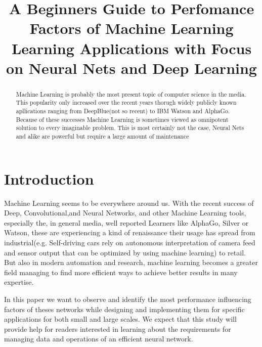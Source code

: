 \documentclass[conference]{IEEEtran}
\begin{document}
\title{
A Beginners Guide to Perfomance Factors of Machine Learning Learning Applications with Focus on Neural Nets and Deep Learning
}

\author{
}

\maketitle

\begin{abstract}

Machine Learning is probably the most present topic of computer science in the media. This popularity only increased over the recent years thorugh widely publicly known apllications ranging from DeepBlue(not so recent) to IBM Watson and AlphaGo. Because of these successes Machine Learning is sometimes viewed as omnipotent solution to every imaginable problem. This is most certainly not the case, Neural Nets and alike are powerful but require a large amount of maintenance

\end{abstract}

\IEEEpeerreviewmaketitle
\section{Introduction}
Machine Learning seems to be everywhere around us. With the recent success of Deep, Convolutional,and Neural Networks, and other Machine Learning tools, especially the, in general media, well reported Learners like AlphaGo, Silver or Watson, these are experiencing a kind of renaissance their usage has spread from industrial(e.g. Self-driving cars rely on autonomous interpretation of camera feed and sensor output that can be optimized by using machine learning) to retail. But also in modern automation and research, machine learning becomes a greater field managing to find more efficient ways to achieve better results in many expertise.

In this paper we want to observe and identify the most performance influencing factors of theses networks while designing and implementing them for specific applications for both small and large scales.
We expect that this study will provide help for readers interested in learning about the requirements for managing data and operations of an efficient neural network.
\end{document}
